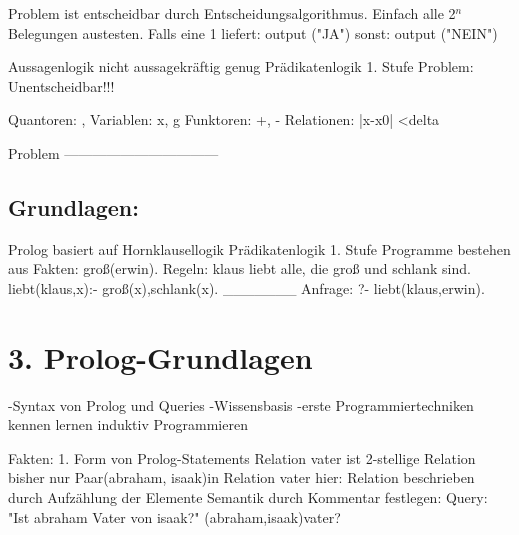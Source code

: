 \documentclass[11pt]{scrartcl}
\begin{document}
Problem ist entscheidbar durch Entscheidungsalgorithmus.
Einfach alle 2$^n$ Belegungen austesten.
Falls eine 1 liefert: output ("JA")
			   sonst: output ("NEIN")
			   
Aussagenlogik nicht aussagekräftig genug
Prädikatenlogik 1. Stufe
Problem: Unentscheidbar!!!

Quantoren: \exists , \forall
Variablen: x, g
Funktoren: +, -
Relationen: |x-x0| <delta

	Problem
---------------------------------


\subsection{Grundlagen:}

Prolog basiert auf Hornklausellogik \leq Prädikatenlogik 1. Stufe
Programme bestehen aus
Fakten: groß(erwin).
Regeln: klaus liebt alle, die groß und schlank sind.
		liebt(klaus,x):- groß(x),schlank(x).
_______
Anfrage: ?- liebt(klaus,erwin).


\section{3. Prolog-Grundlagen}

-Syntax von Prolog und Queries
-Wissensbasis
-erste Programmiertechniken kennen lernen
induktiv Programmieren

Fakten:
1. Form von Prolog-Statements
Relation vater ist 2-stellige Relation
bisher nur Paar(abraham, isaak)in Relation vater
hier: Relation beschrieben durch Aufzählung der Elemente
Semantik durch Kommentar festlegen:
Query: "Ist abraham Vater von isaak?"
		(abraham,isaak)\in vater?
		
\end{document}
